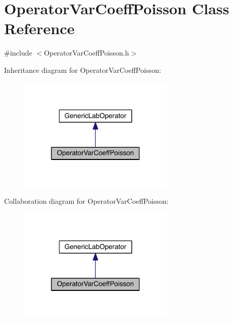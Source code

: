 \hypertarget{class_operator_var_coeff_poisson}{}\section{Operator\+Var\+Coeff\+Poisson Class Reference}
\label{class_operator_var_coeff_poisson}


{\ttfamily \#include $<$Operator\+Var\+Coeff\+Poisson.\+h$>$}



Inheritance diagram for Operator\+Var\+Coeff\+Poisson\+:\nopagebreak
\begin{figure}[H]
\begin{center}
\leavevmode
\includegraphics[width=210pt]{d9/dc2/class_operator_var_coeff_poisson__inherit__graph}
\end{center}
\end{figure}


Collaboration diagram for Operator\+Var\+Coeff\+Poisson\+:\nopagebreak
\begin{figure}[H]
\begin{center}
\leavevmode
\includegraphics[width=210pt]{dd/d61/class_operator_var_coeff_poisson__coll__graph}
\end{center}
\end{figure}
